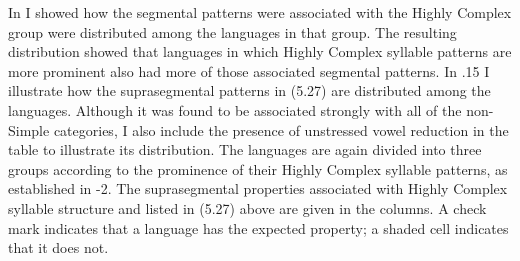   In  I showed how the segmental patterns were associated with the Highly Complex group were distributed among the languages in that group. The resulting distribution showed that languages in which Highly Complex syllable patterns are more prominent also had more of those associated segmental patterns. In .15 I illustrate how the suprasegmental patterns in (5.27) are distributed among the languages. Although it was found to be associated strongly with all of the non-Simple categories, I also include the presence of unstressed vowel reduction in the table to illustrate its distribution. The languages are again divided into three groups according to the prominence of their Highly Complex syllable patterns, as established in -2. The suprasegmental properties associated with Highly Complex syllable structure and listed in (5.27) above are given in the columns. A check mark indicates that a language has the expected property; a shaded cell indicates that it does not. 

